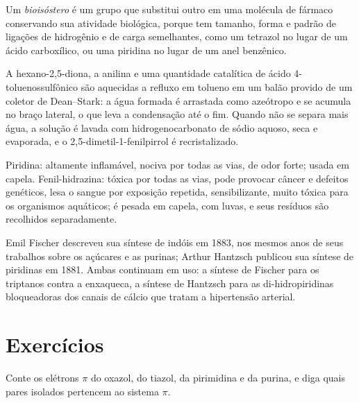 \begin{definition}[Bioisóstero]\label{def:b3:heterocycles:bioisostere}
Um \emph{bioisóstero} é um grupo que substitui outro em uma
molécula de fármaco conservando sua atividade biológica, porque tem tamanho,
forma e padrão de ligações de hidrogênio e de carga semelhantes, como um tetrazol no
lugar de um ácido carboxílico, ou uma piridina no lugar de um anel benzênico.
\end{definition}

\begin{inthelab}
A hexano-2,5-diona, a anilina e uma quantidade catalítica de ácido 4-toluenossulfônico são
aquecidas a refluxo em tolueno em um balão provido de um coletor de Dean--Stark: a
água formada é arrastada como azeótropo e se acumula no braço lateral, o que
leva a condensação até o fim. Quando não se separa mais água, a
solução é lavada com hidrogenocarbonato de sódio aquoso, seca e evaporada,
e o 2,5-dimetil-1-fenilpirrol é recristalizado.
\end{inthelab}

\begin{safety}{}
Piridina: altamente inflamável, nociva por todas as vias, de odor forte; usada em
capela. Fenil-hidrazina: tóxica por todas as vias, pode provocar câncer e defeitos
genéticos, lesa o sangue por exposição repetida, sensibilizante, muito tóxica para os
organismos aquáticos; é pesada em capela, com luvas, e seus resíduos são recolhidos
separadamente.
\end{safety}

\begin{history}
Emil Fischer descreveu sua síntese de indóis em 1883, nos mesmos anos de seus
trabalhos sobre os açúcares e as purinas; Arthur Hantzsch publicou sua síntese de piridinas
em 1881. Ambas continuam em uso: a síntese de Fischer para os
triptanos contra a enxaqueca, a síntese de Hantzsch para as di-hidropiridinas
bloqueadoras dos canais de cálcio que tratam a hipertensão arterial.
\end{history}

\section{Exercícios}

\begin{exercise}[$\star$]\label{exo:b3:heterocycles:1}
Conte os elétrons $\pi$ do oxazol, do tiazol, da pirimidina e da purina, e diga quais
pares isolados pertencem ao sistema $\pi$.
\end{exercise}

